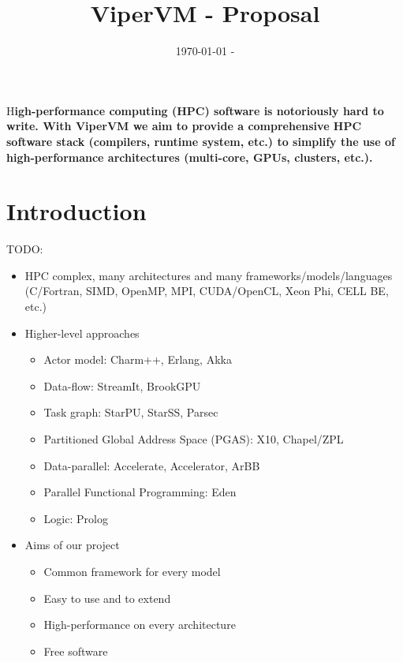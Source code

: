 \documentclass[DIV=calc, paper=a4, fontsize=11pt, twocolumn]{scrartcl}	 %
\title{ViperVM - Proposal} %
\date{\today{} - \currenttime}
\newcommand{\initial}[1]{ %
\lettrine[lines=3,lhang=0.3,nindent=0em]{
\color{DarkGoldenrod}
{\textsf{#1}}}{}}
\begin{document}
\maketitle %

\thispagestyle{fancy} %


\initial{H}\textbf{igh-performance computing (HPC) software is notoriously hard to
write. With ViperVM we aim to provide a comprehensive HPC software stack
(compilers, runtime system, etc.) to simplify the use of high-performance
architectures (multi-core, GPUs, clusters, etc.).
}


\section{Introduction}

TODO: 
\begin{itemize}
   \item HPC complex, many architectures and many frameworks/models/languages
   (C/Fortran, SIMD, OpenMP, MPI, CUDA/OpenCL, Xeon Phi, CELL BE, etc.)
   \item Higher-level approaches
   \begin{itemize}
      \item Actor model: Charm++, Erlang, Akka
      \item Data-flow: StreamIt, BrookGPU
      \item Task graph: StarPU, StarSS, Parsec
      \item Partitioned Global Address Space (PGAS): X10, Chapel/ZPL
      \item Data-parallel: Accelerate, Accelerator, ArBB
      \item Parallel Functional Programming: Eden
      \item Logic: Prolog
   \end{itemize}
   \item Aims of our project
   \begin{itemize}
      \item Common framework for every model
      \item Easy to use and to extend
      \item High-performance on every architecture
      \item Free software
   \end{itemize}
\end{itemize}
\end{document}
